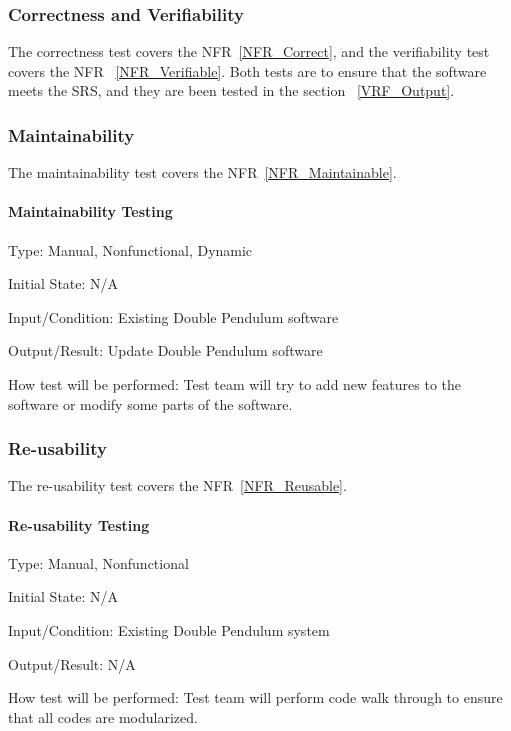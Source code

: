 \documentclass[12pt, titlepage]{article}
\begin{document}
\subsubsection{Correctness and Verifiability}\label{CnV}
		
The correctness test covers the NFR~\ref{NFR_Correct}, and the verifiability
test covers the NFR ~\ref{NFR_Verifiable}. Both tests are to ensure that the
software meets the SRS, and they are been tested in the section
~\ref{VRF_Output}.

\subsubsection{Maintainability}\label{MainTest}
The maintainability test covers the NFR~\ref{NFR_Maintainable}. 
\paragraph{Maintainability Testing\\} 

Type: Manual, Nonfunctional, Dynamic
          
Initial State: N/A
          
Input/Condition: Existing Double Pendulum software
          
Output/Result: Update Double Pendulum software
          
How test will be performed: Test team will try to add new features to the
software or modify some parts of the software. 

\subsubsection{Re-usability}\label{ReuseTest}
The re-usability test covers the NFR~\ref{NFR_Reusable}. 

\paragraph{Re-usability Testing\\}
Type: Manual, Nonfunctional

Initial State: N/A
          
Input/Condition: Existing Double Pendulum system
          
Output/Result: N/A
          
How test will be performed: Test team will perform code walk through to ensure
that all codes are modularized. 
\end{document}
